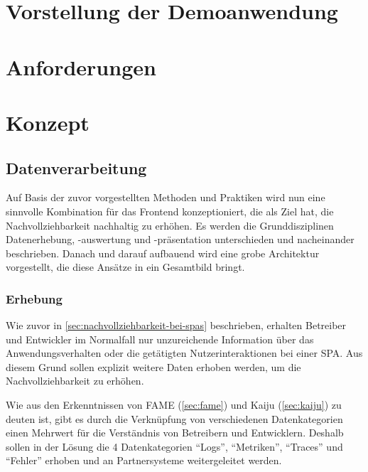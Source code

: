 	
\section{Vorstellung der Demoanwendung}


\vspace{-0.5\baselineskip}
	
\section{Anforderungen}

	
\section{Konzept}
	
	\subsection{Datenverarbeitung}

	Auf Basis der zuvor vorgestellten Methoden und Praktiken wird nun eine sinnvolle Kombination für das Frontend konzeptioniert, die als Ziel hat, die Nachvollziehbarkeit nachhaltig zu erhöhen. Es werden die Grunddisziplinen Datenerhebung, -auswertung und -präsentation unterschieden und nacheinander beschrieben. Danach und darauf aufbauend wird eine grobe Architektur vorgestellt, die diese Ansätze in ein Gesamtbild bringt.
		
	\subsubsection{Erhebung}
	
	Wie zuvor in \autoref{sec:nachvollziehbarkeit-bei-spas} beschrieben, erhalten Betreiber und Entwickler im Normalfall nur unzureichende Information über das Anwendungsverhalten oder die getätigten Nutzerinteraktionen bei einer SPA. Aus diesem Grund sollen explizit weitere Daten erhoben werden, um die Nachvollziehbarkeit zu erhöhen.
	
	Wie aus den Erkenntnissen von FAME (\autoref{sec:fame}) und Kaiju (\autoref{sec:kaiju}) zu deuten ist, gibt es durch die Verknüpfung von verschiedenen Datenkategorien einen Mehrwert für die Verständnis von Betreibern und Entwicklern. Deshalb sollen in der Lösung die 4 Datenkategorien \enquote{Logs}, \enquote{Metriken}, \enquote{Traces} und \enquote{Fehler} erhoben und an Partnersysteme weitergeleitet werden.
	
